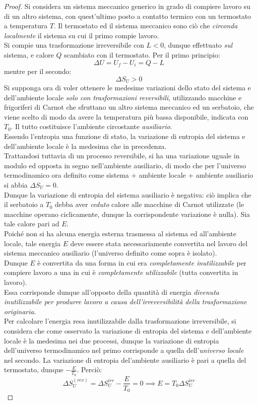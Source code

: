 \documentclass[10pt, oneside]{book}
\newcommand{\deltas}[1]{\Delta S_{#1}}
\newcommand{\ds}{\displaystyle}
\begin{document}
\begin{proof}
Si considera un sistema meccanico generico in grado di compiere lavoro su di un altro sistema, con quest'ultimo posto a contatto termico con un termostato a temperatura $T$. Il termostato ed il sistema meccanico sono ciò che \textit{circonda localmente} il sistema su cui il primo compie lavoro.\\
Si compie una trasformazione irreversibile con $L < 0$, dunque effettuato \textit{sul} sistema, e calore $Q$ scambiato con il termostato. Per il primo principio:
\[\Delta U = U_f - U_i = Q - L\]
mentre per il secondo:
\[\Delta S_U > 0\]
Si supponga ora di voler ottenere le medesime variazioni dello stato del sistema e dell'ambiente locale \textit{solo con trasformazioni reversibili}, utilizzando macchine e frigoriferi di Carnot che sfruttano un altro sistema meccanico ed un serbatoio, che viene scelto di modo da avere la temperatura più bassa disponibile, indicata con $T_0$. Il tutto costituisce l'ambiente circostante \textit{ausiliario}. \\
Essendo l'entropia una funzione di stato, la variazione di entropia del sistema e dell'ambiente locale è la medesima che in precedenza.\\
Trattandosi tuttavia di un processo reversibile, si ha una variazione uguale in modulo ed opposta in segno nell'ambiente ausiliario, di modo che per l'universo termodinamico ora definito come sistema + ambiente locale + ambiente ausiliario si abbia $\ds \deltas{U} = 0$.\\
Dunque la variazione di entropia del sistema ausiliario è negativa: ciò implica che il serbatoio a $T_0$ debba aver \textit{ceduto} calore alle macchine di Carnot utilizzate (le macchine operano ciclicamente, dunque la corrispondente variazione è nulla). Sia tale calore pari ad $E$.\\
Poiché non si ha alcuna energia esterna trasmessa al sistema ed all'ambiente locale, tale energia $E$ deve essere stata necessariamente convertita nel lavoro del sistema meccanico ausiliario (l'universo definito come sopra è isolato).\\
Dunque $E$ è convertita da una forma in cui era \textit{completamente inutilizzabile} per compiere lavoro a una in cui è \textit{completamente utilizzabile} (tutta convertita in lavoro).\\
Essa corrisponde dunque all'opposto della quantità di energia \textit{divenuta inutilizzabile per produrre lavoro a causa dell'irreversibilità della trasformazione originaria}.\\
Per calcolare l'energia resa inutilizzabile dalla trasformazione irreversibile, si considera che come osservato la variazione di entropia del sistema e dell'ambiente locale è la medesima nei due processi, dunque la variazione di entropia dell'universo termodinamico nel primo corrisponde a quella dell'\textit{universo locale} nel secondo. La variazione di entropia del'ambiente ausiliario è pari a quella del termostato, dunque $\ds -\frac{E}{T_0}$. Perciò:
\[\Delta S_U^{(rev)} = \Delta S_U^{irr} - \frac{E}{T_0} = 0 \implies E = T_0 \Delta S_U^{irr}\]
\end{proof}
\end{document}

